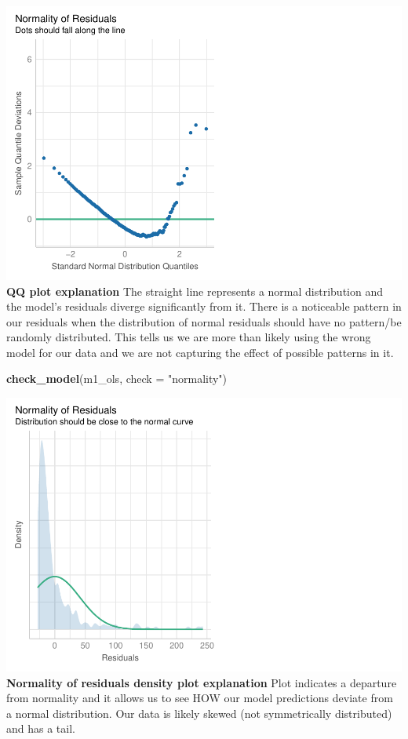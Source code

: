 \documentclass[
]{article}
\newenvironment{Shaded}{\begin{snugshade}}{\end{snugshade}}
\newcommand{\AttributeTok}[1]{\textcolor[rgb]{0.13,0.29,0.53}{#1}}
\newcommand{\FunctionTok}[1]{\textcolor[rgb]{0.13,0.29,0.53}{\textbf{#1}}}
\newcommand{\NormalTok}[1]{#1}
\newcommand{\StringTok}[1]{\textcolor[rgb]{0.31,0.60,0.02}{#1}}
\begin{document}
\includegraphics{hw1-lobstrs-eds241_files/figure-latex/unnamed-chunk-14-1.pdf}
\textbf{QQ plot explanation} The straight line represents a normal
distribution and the model's residuals diverge significantly from it.
There is a noticeable pattern in our residuals when the distribution of
normal residuals should have no pattern/be randomly distributed. This
tells us we are more than likely using the wrong model for our data and
we are not capturing the effect of possible patterns in it.

\begin{Shaded}
\begin{Highlighting}[]
\FunctionTok{check\_model}\NormalTok{(m1\_ols, }\AttributeTok{check =} \StringTok{"normality"}\NormalTok{)}
\end{Highlighting}
\end{Shaded}

\includegraphics{hw1-lobstrs-eds241_files/figure-latex/unnamed-chunk-15-1.pdf}
\textbf{Normality of residuals density plot explanation} Plot indicates
a departure from normality and it allows us to see HOW our model
predictions deviate from a normal distribution. Our data is likely
skewed (not symmetrically distributed) and has a tail.
\end{document}
